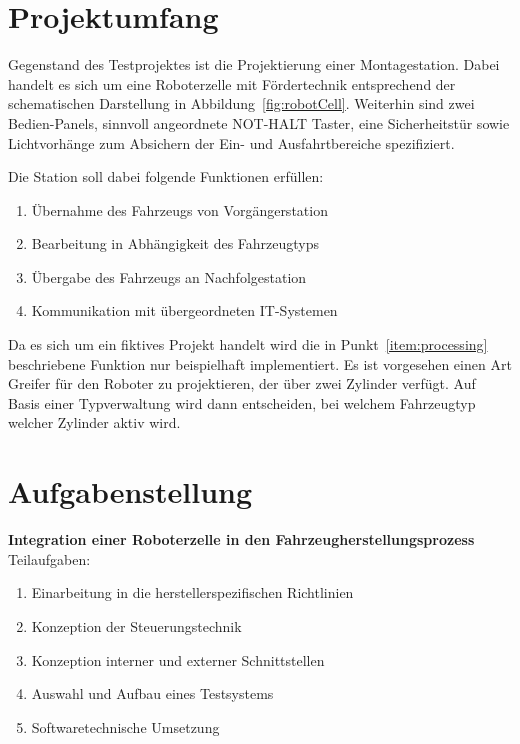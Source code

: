\section{Projektumfang}
\label{sec:project_content}
Gegenstand des Testprojektes ist die Projektierung einer Montagestation. Dabei handelt es sich um eine Roboterzelle mit Fördertechnik entsprechend der schematischen Darstellung in Abbildung~\ref{fig:robotCell}.
Weiterhin sind zwei Bedien-Panels, sinnvoll angeordnete NOT-HALT Taster, eine Sicherheitstür sowie Lichtvorhänge zum Absichern der Ein- und Ausfahrtbereiche spezifiziert.

Die Station soll dabei folgende Funktionen erfüllen:
\begin{enumerate}
	\itemsep0.05em
	\item Übernahme des Fahrzeugs von Vorgängerstation
	\item \label{item:processing}Bearbeitung in Abhängigkeit des Fahrzeugtyps
	\item Übergabe des Fahrzeugs an Nachfolgestation
	\item Kommunikation mit übergeordneten IT-Systemen
\end{enumerate}

Da es sich um ein fiktives Projekt handelt wird die in Punkt~\ref{item:processing} beschriebene Funktion nur beispielhaft implementiert. Es ist vorgesehen einen Art Greifer für den Roboter zu projektieren, der über zwei Zylinder verfügt. Auf Basis einer Typverwaltung wird dann entscheiden, bei welchem Fahrzeugtyp welcher Zylinder aktiv wird.

\section{Aufgabenstellung}

\textbf{Integration einer Roboterzelle in den Fahrzeugherstellungsprozess}\leer
Teilaufgaben:%
\begin{enumerate}
	\itemsep 0.05em
	\item Einarbeitung in die herstellerspezifischen Richtlinien
	\item Konzeption der Steuerungstechnik
	\item Konzeption interner und externer Schnittstellen
	\item Auswahl und Aufbau eines Testsystems
	\item Softwaretechnische Umsetzung
\end{enumerate}

